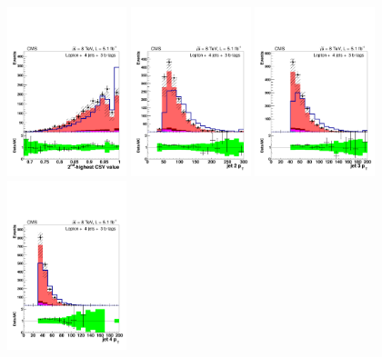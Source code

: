 \begin{figure}[hbtp]
 \begin{center}
   \includegraphics[width=0.31\textwidth]{Figures/Analysis_1_Diagrams/d2MCPlots_second_highest_btag_cut4_j4_t3_Combined_HtWgt.pdf}
   \includegraphics[width=0.31\textwidth]{Figures/Analysis_1_Diagrams/d2MCPlots_second_jet_pt_cut4_j4_t3_Combined_HtWgt.pdf}
   \includegraphics[width=0.31\textwidth]{Figures/Analysis_1_Diagrams/d2MCPlots_third_jet_pt_cut4_j4_t3_Combined_HtWgt.pdf}
   \includegraphics[width=0.31\textwidth]{Figures/Analysis_1_Diagrams/d2MCPlots_fourth_jet_pt_cut4_j4_t3_Combined_HtWgt.pdf}

\end{center}
\end{figure}
